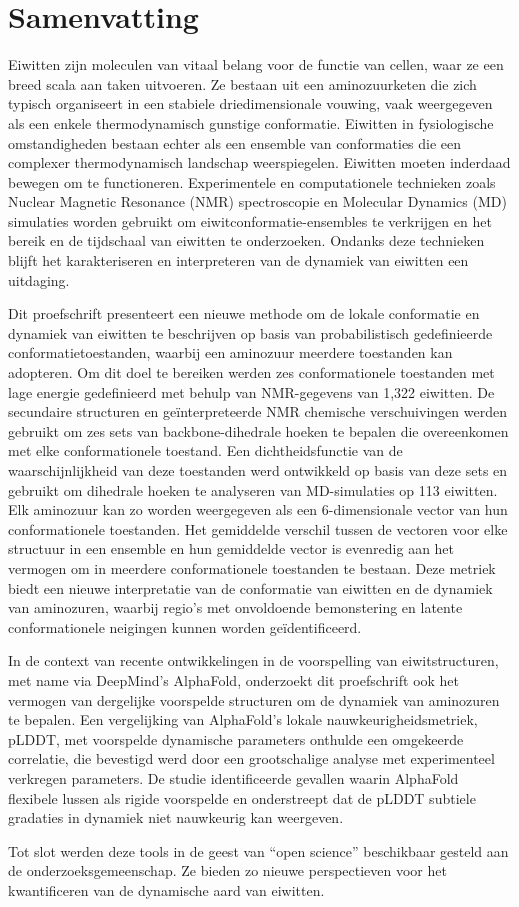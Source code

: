 \chapter*{Samenvatting}

Eiwitten zijn moleculen van vitaal belang voor de functie van cellen, waar ze een breed scala aan taken uitvoeren. Ze bestaan uit een aminozuurketen die zich typisch organiseert in een stabiele driedimensionale vouwing, vaak weergegeven als een enkele thermodynamisch gunstige conformatie. Eiwitten in fysiologische omstandigheden bestaan echter als een ensemble van conformaties die een complexer thermodynamisch landschap weerspiegelen. Eiwitten moeten inderdaad bewegen om te functioneren. Experimentele en computationele technieken zoals Nuclear Magnetic Resonance (NMR) spectroscopie en Molecular Dynamics (MD) simulaties worden gebruikt om eiwitconformatie-ensembles te verkrijgen en het bereik en de tijdschaal van eiwitten te onderzoeken. Ondanks deze technieken blijft het karakteriseren en interpreteren van de dynamiek van eiwitten een uitdaging.

Dit proefschrift presenteert een nieuwe methode om de lokale conformatie en dynamiek van eiwitten te beschrijven op basis van probabilistisch gedefinieerde conformatietoestanden, waarbij een aminozuur meerdere toestanden kan adopteren. Om dit doel te bereiken werden zes conformationele toestanden met lage energie gedefinieerd met behulp van NMR-gegevens van 1,322 eiwitten. De secundaire structuren en geïnterpreteerde NMR chemische verschuivingen werden gebruikt om zes sets van backbone-dihedrale hoeken te bepalen die overeenkomen met elke conformationele toestand. Een dichtheidsfunctie van de waarschijnlijkheid van deze toestanden werd ontwikkeld op basis van deze sets en gebruikt om dihedrale hoeken te analyseren van MD-simulaties op 113 eiwitten. Elk aminozuur kan zo worden weergegeven als een 6-dimensionale vector van hun conformationele toestanden. Het gemiddelde verschil tussen de vectoren voor elke structuur in een ensemble en hun gemiddelde vector is evenredig aan het vermogen om in meerdere conformationele toestanden te bestaan. Deze metriek biedt een nieuwe interpretatie van de conformatie van eiwitten en de dynamiek van aminozuren, waarbij regio's met onvoldoende bemonstering en latente conformationele neigingen kunnen worden geïdentificeerd.

In de context van recente ontwikkelingen in de voorspelling van eiwitstructuren, met name via DeepMind's AlphaFold, onderzoekt dit proefschrift ook het vermogen van dergelijke voorspelde structuren om de dynamiek van aminozuren te bepalen. Een vergelijking van AlphaFold's lokale nauwkeurigheidsmetriek, pLDDT, met voorspelde dynamische parameters onthulde een omgekeerde correlatie, die bevestigd werd door een grootschalige analyse met experimenteel verkregen parameters. De studie identificeerde gevallen waarin AlphaFold flexibele lussen als rigide voorspelde en onderstreept dat de pLDDT subtiele gradaties in dynamiek niet nauwkeurig kan weergeven.

Tot slot werden deze tools in de geest van ``open science'' beschikbaar gesteld aan de onderzoeksgemeenschap. Ze bieden zo nieuwe perspectieven voor het kwantificeren van de dynamische aard van eiwitten.


